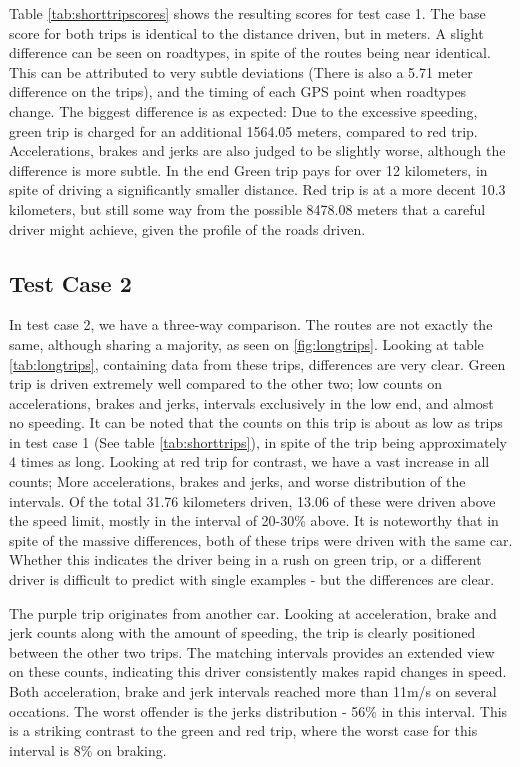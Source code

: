 Table \ref{tab:shorttripscores} shows the resulting scores for test case 1. The base score for both trips is identical to the distance driven, but in meters. A slight difference can be seen on roadtypes, in spite of the routes being near identical. This can be attributed to very subtle deviations (There is also a 5.71 meter difference on the trips), and the timing of each GPS point when roadtypes change. The biggest difference is as expected: Due to the excessive speeding, green trip is charged for an additional 1564.05 meters, compared to red trip. Accelerations, brakes and jerks are also judged to be slightly worse, although the difference is more subtle. In the end Green trip pays for over 12 kilometers, in spite of driving a significantly smaller distance. Red trip is at a more decent 10.3 kilometers, but still some way from the possible 8478.08 meters that a careful driver might achieve, given the profile of the roads driven.

\subsection{Test Case 2} \label{subsec:expe2}
In test case 2, we have a three-way comparison. The routes are not exactly the same, although sharing a majority, as seen on \ref{fig:longtrips}. Looking at table \ref{tab:longtrips}, containing data from these trips, differences are very clear. Green trip is driven extremely well compared to the other two; low counts on accelerations, brakes and jerks, intervals exclusively in the low end, and almost no speeding. It can be noted that the counts on this trip is about as low as trips in test case 1 (See table \ref{tab:shorttrips}), in spite of the trip being approximately 4 times as long.
Looking at red trip for contrast, we have a vast increase in all counts; More accelerations, brakes and jerks, and worse distribution of the intervals. Of the total 31.76 kilometers driven, 13.06 of these were driven above the speed limit, mostly in the interval of 20-30\% above.
It is noteworthy that in spite of the massive differences, both of these trips were driven with the same car. Whether this indicates the driver being in a rush on green trip, or a different driver is difficult to predict with single examples - but the differences are clear.

The purple trip originates from another car. Looking at acceleration, brake and jerk counts along with the amount of speeding, the trip is clearly positioned between the other two trips. The matching intervals provides an extended view on these counts, indicating this driver consistently makes rapid changes in speed. Both acceleration, brake and jerk intervals reached more than 11m/s on several occations. The worst offender is the jerks distribution - 56\% in this interval. This is a striking contrast to the green and red trip, where the worst case for this interval is 8\% on braking.

